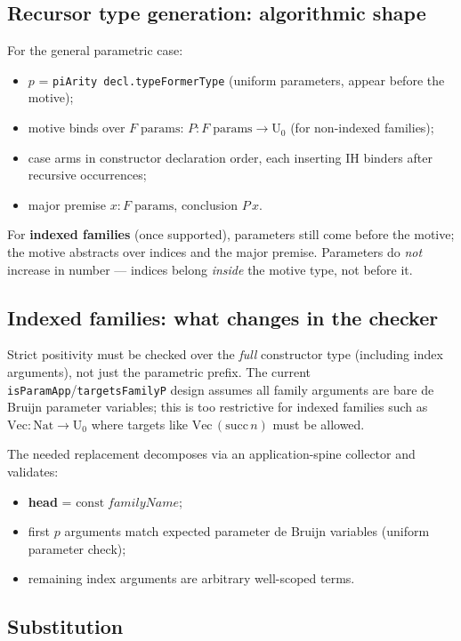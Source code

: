 \documentclass[11pt]{article}
\theoremstyle{remark}
\newcommand{\leanref}[1]{\texttt{#1}}
\begin{document}
\subsection{Recursor type generation: algorithmic shape}

For the general parametric case:
\begin{itemize}[nosep]
  \item $p$ = \leanref{piArity decl.typeFormerType} (uniform parameters, appear
    before the motive);
  \item motive binds over $F\;\text{params}$:
    $P : F\;\text{params} \to \mathrm{U}_0$ (for non-indexed families);
  \item case arms in constructor declaration order, each inserting IH binders
    after recursive occurrences;
  \item major premise $x : F\;\text{params}$, conclusion $P\,x$.
\end{itemize}
For \textbf{indexed families} (once supported), parameters still come before
the motive; the motive abstracts over indices and the major premise.
Parameters do \emph{not} increase in number --- indices belong \emph{inside}
the motive type, not before it.

\subsection{Indexed families: what changes in the checker}

Strict positivity must be checked over the \emph{full} constructor type
(including index arguments), not just the parametric prefix.
The current \leanref{isParamApp}/\leanref{targetsFamilyP} design assumes all
family arguments are bare de Bruijn parameter variables; this is too restrictive
for indexed families such as $\mathrm{Vec} : \mathrm{Nat} \to \mathrm{U}_0$
where targets like $\mathrm{Vec}\,(\mathrm{succ}\,n)$ must be allowed.

The needed replacement decomposes via an application-spine collector and
validates:
\begin{itemize}[nosep]
  \item \textbf{head} = $\mathrm{const}\;\mathit{familyName}$;
  \item first $p$ arguments match expected parameter de Bruijn variables
    (uniform parameter check);
  \item remaining index arguments are arbitrary well-scoped terms.
\end{itemize}

\subsection{Substitution}
\end{document}
